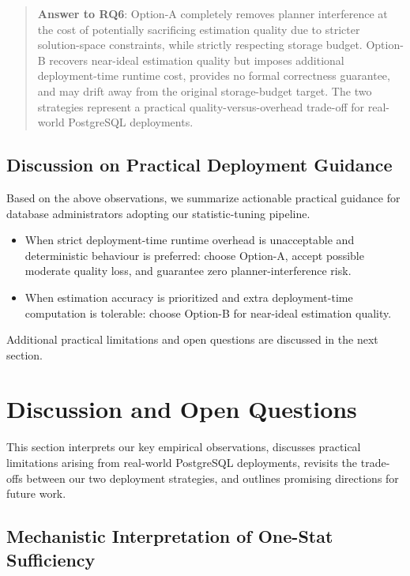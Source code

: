\documentclass[sigconf, nonacm]{acmart}
\begin{document}
\begin{quote}
\noindent\textbf{Answer to RQ6}:
Option-A completely removes planner interference at the cost of potentially sacrificing estimation quality due to stricter solution-space constraints, while strictly respecting storage budget.
Option-B recovers near-ideal estimation quality but imposes additional deployment-time runtime cost, provides no formal correctness guarantee, and may drift away from the original storage-budget target.
The two strategies represent a practical quality-versus-overhead trade-off for real-world PostgreSQL deployments.
\end{quote}

\subsection{Discussion on Practical Deployment Guidance}
\label{sec:deploy_guidance}

Based on the above observations, we summarize actionable practical guidance for database administrators adopting our statistic-tuning pipeline.
\begin{itemize}
    \item When strict deployment-time runtime overhead is unacceptable and deterministic behaviour is preferred: choose Option-A, accept possible moderate quality loss, and guarantee zero planner-interference risk.
    \item When estimation accuracy is prioritized and extra deployment-time computation is tolerable: choose Option-B for near-ideal estimation quality.
\end{itemize}

Additional practical limitations and open questions are discussed in the next section.

\section{Discussion and Open Questions}
\label{sec:discussion}
\label{sec:disc}

This section interprets our key empirical observations, discusses practical limitations arising from real-world PostgreSQL deployments, revisits the trade-offs between our two deployment strategies, and outlines promising directions for future work.

\subsection{Mechanistic Interpretation of One-Stat Sufficiency}
\label{sec:mechanistic_interp}
\end{document}
